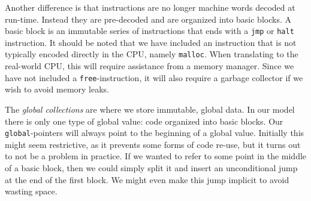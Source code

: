 Another difference is that instructions are no longer machine words decoded at
run-time. Instead they are pre-decoded and are organized into basic blocks. A
basic block is an immutable series of instructions that ends with a \texttt{jmp}
or \texttt{halt} instruction. It should be noted that we have included an
instruction that is not typically encoded directly in the CPU, namely
\texttt{malloc}. When translating to the real-world CPU, this will require
assistance from a memory manager. Since we have not included a
\texttt{free}-instruction, it will also require a garbage collector if we wish
to avoid memory leaks.

The \emph{global collections} are where we store immutable, global data. In our
model there is only one type of global value: code organized into basic
blocks. Our \texttt{global}-pointers will always point to the beginning of a
global value. Initially this might seem restrictive, as it prevents some forms
of code re-use, but it turns out to not be a problem in practice. If we wanted
to refer to some point in the middle of a basic block, then we could simply
split it and insert an unconditional jump at the end of the first block. We
might even make this jump implicit to avoid wasting space.


